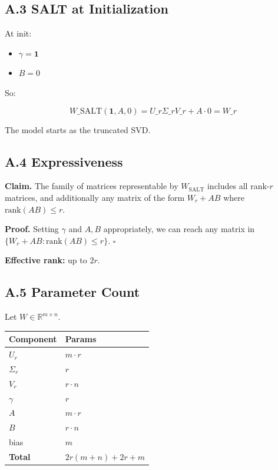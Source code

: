 \subsection{A.3 SALT at Initialization}

At init:

\begin{itemize}
\item $\gamma = \mathbf{1}$
\item $B = 0$

\end{itemize}
So:

\[
W\_\text{SALT}(\mathbf{1}, A, 0) = U\_r \Sigma\_r V\_r + A \cdot 0 = W\_r
\tag{A.3}
\]

The model starts as the truncated SVD.

\subsection{A.4 Expressiveness}

\textbf{Claim.} The family of matrices representable by $W_\text{SALT}$ includes 
all rank-$r$ matrices, and additionally any matrix of the form 
$W_r + AB$ where $\text{rank}(AB) \leq r$.

\textbf{Proof.} Setting $\gamma$ and $A, B$ appropriately, we can reach any 
matrix in $\{W_r + AB : \text{rank}(AB) \leq r\}$. $\square$

\textbf{Effective rank:} up to $2r$.

\subsection{A.5 Parameter Count}

Let $W \in \mathbb{R}^{m \times n}$.

\begin{table}[H]
\centering
\small
\begin{tabular}{ll}
\toprule
\textbf{Component} & \textbf{Params} \\
\midrule
$U_r$ & $m \cdot r$ \\
$\Sigma_r$ & $r$ \\
$V_r$ & $r \cdot n$ \\
$\gamma$ & $r$ \\
$A$ & $m \cdot r$ \\
$B$ & $r \cdot n$ \\
bias & $m$ \\
\textbf{Total} & $2r(m + n) + 2r + m$ \\
\bottomrule
\end{tabular}
\end{table}

